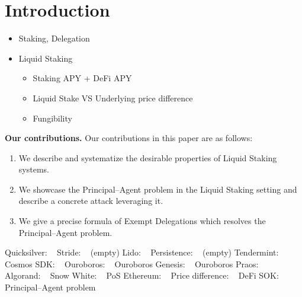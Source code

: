 \section{Introduction}

\begin{itemize}
    \item Staking, Delegation
    \item Liquid Staking
        \begin{itemize}
            \item Staking APY + DeFi APY
            \item Liquid Stake VS Underlying price difference 
            \item Fungibility
        \end{itemize}
\end{itemize}

\noindent
\textbf{Our contributions.} Our contributions in this paper are as follows:
\begin{enumerate}
    \item We describe and systematize the desirable properties of Liquid Staking systems.
    \item We showcase the Principal--Agent problem in the Liquid Staking setting and describe a concrete attack leveraging it.
    \item We give a precise formula of Exempt Delegations which resolves the Principal--Agent problem.
\end{enumerate}

Quicksilver: ~\cite{quicksilver}
Stride: ~\cite{stride} (empty)
Lido: ~\cite{lido}
Persistence: ~\cite{persistence} (empty)
Tendermint: ~\cite{2018tendermint, buchman2016tendermint}
Cosmos SDK: ~\cite{cosmossdk}
Ouroboros: ~\cite{ouroboros}
Ouroboros Genesis: ~\cite{ouroboros-genesis}
Ouroboros Praos: ~\cite{praos}
Algorand: ~\cite{algorand}
Snow White: ~\cite{DBLP:journals/iacr/BentovPS16a}
PoS Ethereum: ~\cite{casper,buterin2020combining,sompolinsky2015secure,kiayias2017trees}
Price difference: ~\cite{scharnowski2022liquid}
DeFi SOK: ~\cite{defisok}
Principal--Agent problem~\cite{jensen1976,wealthofnations}